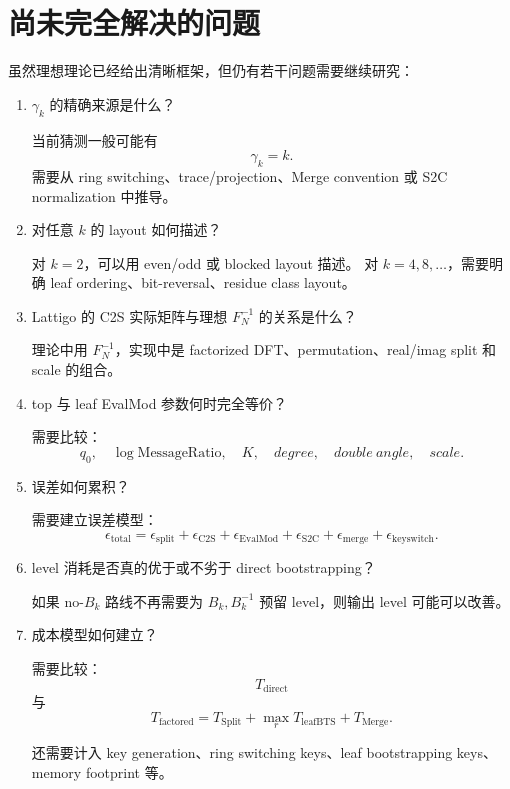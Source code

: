 \documentclass[UTF8,11pt]{ctexart}
\theoremstyle{definition}
\begin{document}
\section{尚未完全解决的问题}

虽然理想理论已经给出清晰框架，但仍有若干问题需要继续研究：

\begin{enumerate}[label=(\arabic*)]
    \item \(\gamma_k\) 的精确来源是什么？
    
    当前猜测一般可能有
    \[
    \gamma_k=k.
    \]
    需要从 ring switching、trace/projection、Merge convention 或 S2C normalization 中推导。
    
    \item 对任意 \(k\) 的 layout 如何描述？
    
    对 \(k=2\)，可以用 even/odd 或 blocked layout 描述。
    对 \(k=4,8,\ldots\)，需要明确 leaf ordering、bit-reversal、residue class layout。
    
    \item Lattigo 的 C2S 实际矩阵与理想 \(F_N^{-1}\) 的关系是什么？
    
    理论中用 \(F_N^{-1}\)，实现中是 factorized DFT、permutation、real/imag split 和 scale 的组合。
    
    \item top 与 leaf EvalMod 参数何时完全等价？
    
    需要比较：
    \[
    q_0,\quad \log\text{MessageRatio},\quad K,\quad degree,\quad double\ angle,\quad scale.
    \]
    
    \item 误差如何累积？
    
    需要建立误差模型：
    \[
    \epsilon_{\mathrm{total}}
    =
    \epsilon_{\mathrm{split}}
    +
    \epsilon_{\mathrm{C2S}}
    +
    \epsilon_{\mathrm{EvalMod}}
    +
    \epsilon_{\mathrm{S2C}}
    +
    \epsilon_{\mathrm{merge}}
    +
    \epsilon_{\mathrm{keyswitch}}.
    \]
    
    \item level 消耗是否真的优于或不劣于 direct bootstrapping？
    
    如果 no-\(B_k\) 路线不再需要为 \(B_k,B_k^{-1}\) 预留 level，则输出 level 可能可以改善。
    
    \item 成本模型如何建立？
    
    需要比较：
    \[
    T_{\mathrm{direct}}
    \]
    与
    \[
    T_{\mathrm{factored}}
    =
    T_{\mathrm{Split}}
    +
    \max_r T_{\mathrm{leafBTS}}
    +
    T_{\mathrm{Merge}}.
    \]
    
    还需要计入 key generation、ring switching keys、leaf bootstrapping keys、memory footprint 等。
\end{enumerate}
\end{document}
